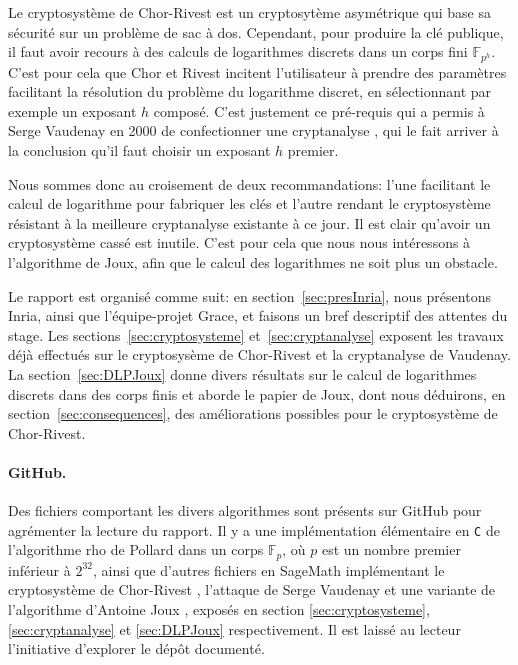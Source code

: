 \documentclass[a4paper, titlepage, 11pt]{article}
\theoremstyle{definition}
\theoremstyle{remark}
\def\gf #1{\mathbb{F}_{#1}}
\begin{document}
Le cryptosystème de Chor-Rivest est un cryptosytème asymétrique qui base sa sécurité sur un problème de sac à dos. Cependant, pour produire la clé publique, il faut avoir recours à des calculs de logarithmes discrets dans un corps fini $\gf{p^h}$. C'est pour cela que Chor et Rivest incitent l'utilisateur à prendre des paramètres facilitant la résolution du problème du logarithme discret, en sélectionnant par exemple un exposant $h$ composé. C'est justement ce pré-requis qui a permis à Serge Vaudenay en 2000 de confectionner une cryptanalyse \cite{vaudenay2000}, qui le fait arriver à la conclusion qu'il faut choisir un exposant $h$ premier.

Nous sommes donc au croisement de deux recommandations: l'une facilitant le calcul de logarithme pour fabriquer les clés et l'autre rendant le cryptosystème résistant à la meilleure cryptanalyse existante à ce jour. Il est clair qu'avoir un cryptosystème cassé est inutile. C'est pour cela que nous nous intéressons à l'algorithme de Joux, afin que le calcul des logarithmes ne soit plus un obstacle.

Le rapport est organisé comme suit: en section~\ref{sec:presInria}, nous présentons Inria, ainsi que l'équipe-projet Grace, et faisons un bref descriptif des attentes du stage. Les sections~\ref{sec:cryptosysteme} et~\ref{sec:cryptanalyse} exposent les travaux déjà effectués sur le cryptosysème de Chor-Rivest et la cryptanalyse de Vaudenay. La section~\ref{sec:DLPJoux} donne divers résultats sur le calcul de logarithmes discrets dans des corps finis et aborde le papier de Joux, dont nous déduirons, en section~\ref{sec:consequences}, des améliorations possibles pour le cryptosystème de Chor-Rivest.

\paragraph{GitHub.} Des fichiers comportant les divers algorithmes sont présents sur GitHub pour agrémenter la lecture du rapport. Il y a une implémentation élémentaire en \verb|C| de l'algorithme rho de Pollard \cite{pollard1978} dans un corps $\gf{p}$, où $p$ est un nombre premier inférieur à $2^{32}$, ainsi que d'autres fichiers en SageMath implémentant le cryptosystème de Chor-Rivest \cite{chorRivest1988}, l'attaque de Serge Vaudenay \cite{vaudenay2000} et une variante de l'algorithme d'Antoine Joux \cite{joux2013}, exposés en section \ref{sec:cryptosysteme}, \ref{sec:cryptanalyse} et \ref{sec:DLPJoux} respectivement. Il est laissé au lecteur l'initiative d'explorer le dépôt documenté.
\end{document}
